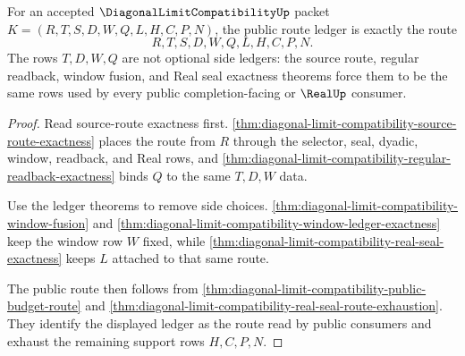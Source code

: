 \begin{theorem}
\label{thm:diagonal-limit-compatibility-route-ledger-public-exactness}
For an accepted $\DiagonalLimitCompatibilityUp$ packet $K=(R,T,S,D,W,Q,L,H,C,P,N)$, the public route ledger is exactly the route
$$
R,T,S,D,W,Q,L,H,C,P,N.
$$
The rows $T,D,W,Q$ are not optional side ledgers: the source route, regular readback, window fusion, and Real seal exactness theorems force them to be the same rows used by every public completion-facing or $\RealUp$ consumer.
\end{theorem}
\begin{proof}
Read source-route exactness first. \autoref{thm:diagonal-limit-compatibility-source-route-exactness} places the route from $R$ through the selector, seal, dyadic, window, readback, and Real rows, and \autoref{thm:diagonal-limit-compatibility-regular-readback-exactness} binds $Q$ to the same $T,D,W$ data.

Use the ledger theorems to remove side choices. \autoref{thm:diagonal-limit-compatibility-window-fusion} and \autoref{thm:diagonal-limit-compatibility-window-ledger-exactness} keep the window row $W$ fixed, while \autoref{thm:diagonal-limit-compatibility-real-seal-exactness} keeps $L$ attached to that same route.

The public route then follows from \autoref{thm:diagonal-limit-compatibility-public-budget-route} and \autoref{thm:diagonal-limit-compatibility-real-seal-route-exhaustion}. They identify the displayed ledger as the route read by public consumers and exhaust the remaining support rows $H,C,P,N$.
\end{proof}

